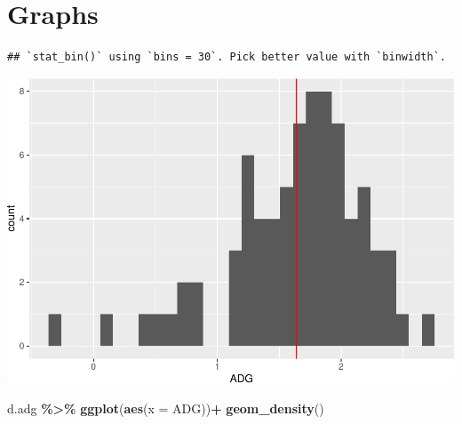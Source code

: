 \documentclass[
]{book}
\newenvironment{Shaded}{\begin{snugshade}}{\end{snugshade}}
\newcommand{\AttributeTok}[1]{\textcolor[rgb]{0.13,0.29,0.53}{#1}}
\newcommand{\CommentTok}[1]{\textcolor[rgb]{0.56,0.35,0.01}{\textit{#1}}}
\newcommand{\FunctionTok}[1]{\textcolor[rgb]{0.13,0.29,0.53}{\textbf{#1}}}
\newcommand{\NormalTok}[1]{#1}
\newcommand{\SpecialCharTok}[1]{\textcolor[rgb]{0.81,0.36,0.00}{\textbf{#1}}}
\newcommand{\StringTok}[1]{\textcolor[rgb]{0.31,0.60,0.02}{#1}}
\begin{document}
\chapter{Graphs}\label{graphs}

\begin{Shaded}
\end{Shaded}

\begin{verbatim}
## `stat_bin()` using `bins = 30`. Pick better value with `binwidth`.
\end{verbatim}

\includegraphics{bookdown-demo_files/figure-latex/unnamed-chunk-7-1.pdf}

\begin{Shaded}
\begin{Highlighting}[]
\NormalTok{d.adg }\SpecialCharTok{\%\textgreater{}\%} 
  \FunctionTok{ggplot}\NormalTok{(}\FunctionTok{aes}\NormalTok{(}\AttributeTok{x =}\NormalTok{ ADG))}\SpecialCharTok{+}
  \FunctionTok{geom\_density}\NormalTok{()}
\end{Highlighting}
\end{Shaded}
\end{document}
